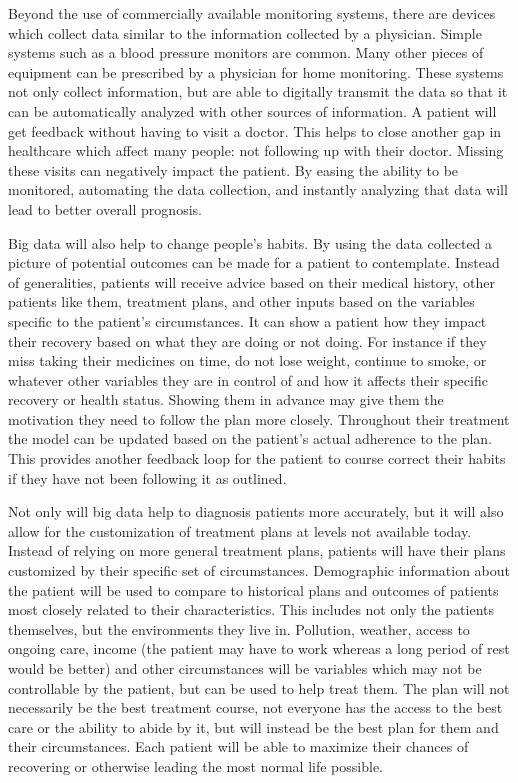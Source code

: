 \documentclass[sigconf]{acmart}
\begin{document}
Beyond the use of commercially available monitoring systems, there 
are devices which collect data similar to the information collected 
by a physician.  Simple systems such as a blood pressure monitors 
are common.  Many other pieces of equipment can be prescribed by a 
physician for home monitoring.  These systems not only collect 
information, but are able to digitally transmit the data so that it 
can be automatically analyzed with other sources of information.  
A patient will get feedback without having to visit a 
doctor\cite{PubHealth}.  This helps to close another gap in 
healthcare which affect many people:  not following up with their 
doctor.  Missing these visits can negatively impact the patient.  
By easing the ability to be monitored, automating the data collection, 
and instantly analyzing that data will lead to better overall 
prognosis.

Big data will also help to change people's habits.  By using the 
data collected a picture of potential outcomes can be made for a 
patient to contemplate.  Instead of generalities, patients will 
receive advice based on their medical history, other patients like 
them, treatment plans, and other inputs based on the variables 
specific to the patient's circumstances.  It can show a patient how 
they impact their recovery based on what they are doing or not 
doing.  For instance if they miss taking their medicines on time, 
do not lose weight, continue to smoke, or whatever other variables 
they are in control of and how it affects their specific recovery 
or health status.  Showing them in advance may give them the 
motivation they need to follow the plan more closely.  Throughout 
their treatment the model can be updated based on the patient’s 
actual adherence to the plan.  This provides another feedback loop 
for the patient to course correct their habits if they have not 
been following it as outlined\cite{PubHealth}.

Not only will big data help to diagnosis patients more accurately, 
but it will also allow for the customization of treatment plans at 
levels not available today.  Instead of relying on more general 
treatment plans, patients will have their plans customized by their 
specific set of circumstances.  Demographic information about the 
patient will be used to compare to historical plans and outcomes 
of patients most closely related to their characteristics.  This 
includes not only the patients themselves, but the environments 
they live in.  Pollution, weather, access to ongoing care, income 
(the patient may have to work whereas a long period of rest would 
be better) and other circumstances will be variables which may not 
be controllable by the patient, but can be used to help treat them.  
The plan will not necessarily be the best treatment course, not 
everyone has the access to the best care or the ability to abide 
by it, but will instead be the best plan for them and their 
circumstances.  Each patient will be able to maximize their chances 
of recovering or otherwise leading the most normal life possible. 
\end{document}
